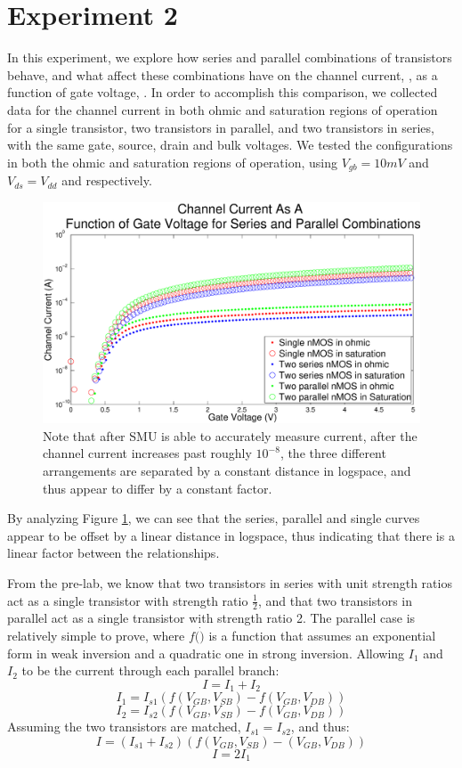 \section*{Experiment 2}
In this experiment, we explore how series and parallel combinations of \nMOS transistors behave, 
and what affect these combinations have on the channel current, \Isat, as a function of gate voltage,
\Vg. In order to accomplish this comparison, we collected data for the channel current in both ohmic 
and saturation regions of operation for a single \nMOS transistor, two transistors in parallel, and
two transistors in series, with the same gate, source, drain and bulk voltages. We tested the 
configurations in both the ohmic and saturation regions of operation, using $V_{gb} = 10mV$ and
 $ V_{ds} = V_{dd}$ and respectively.

\begin{figure}[H]
\centering
\includegraphics[width=\linewidth]{../Figures/Experiment2Currents.eps}
\caption{Note that after SMU is able to accurately measure current, after the channel current increases past roughly $10^{-8}$, the three different arrangements are separated by a constant distance in logspace, and thus appear to differ by a constant factor.}
\label{fig:exp2currents}
\end{figure}

By analyzing Figure \ref{fig:exp2currents}, we can see that the series, parallel and single curves appear to be offset by a linear distance in logspace, thus indicating that there is a linear factor between the relationships. 

From the pre-lab, we know that two transistors in series with unit strength ratios act as a single \nMOS transistor with strength ratio $\frac{1}{2}$, and that two \nMOS transistors in parallel act as a single \nMOS transistor with strength ratio 2. The parallel case is relatively simple to prove, where $f(\dot)$ is a function that assumes an exponential form in weak inversion and a quadratic one in
strong inversion. Allowing $I_1$ and $I_2$ to be the current through each parallel branch:
$$ I = I_1 + I_2$$
$$I_1 = I_{s1}(f(V_{GB}, V_{SB})-f(V_{GB}, V_{DB}))$$
$$I_2 = I_{s2}(f(V_{GB}, V_{SB})-f(V_{GB}, V_{DB}))$$
Assuming the two transistors are matched, $I_{s1} = I_{s2}$, and thus:
$$ I = (I_{s1} + I_{s2})(f(V_{GB}, V_{SB})-(V_{GB}, V_{DB}))$$
$$ I= 2I_1$$

